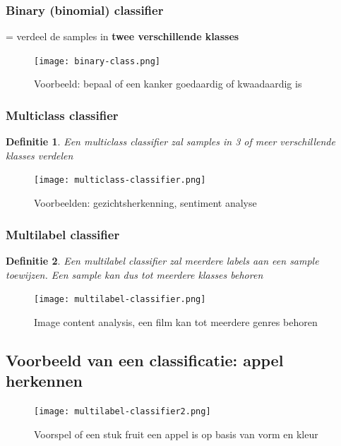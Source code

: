 \documentclass{article}
\newtheorem{theorem}{Definitie}[section]
\begin{document}
\subsubsection{Binary (binomial) classifier}

= verdeel de samples in \textbf{twee verschillende klasses}

\begin{figure}[H]
    \centering
    \texttt{[image: binary-class.png]}
    \caption{Voorbeeld: bepaal of een kanker goedaardig of kwaadaardig is}
\end{figure}

\subsubsection{Multiclass classifier}

\begin{theorem}
    Een multiclass classifier zal samples in 3 of meer verschillende klasses verdelen
\end{theorem}

\begin{figure}[H]
    \centering
    \texttt{[image: multiclass-classifier.png]}
    \caption{Voorbeelden: gezichtsherkenning, sentiment analyse}
\end{figure}

\subsubsection{Multilabel classifier}

\begin{theorem}
    Een multilabel classifier zal meerdere labels aan een sample toewijzen.
    Een sample kan dus tot meerdere klasses behoren
\end{theorem}

\begin{figure}[H]
    \centering
    \texttt{[image: multilabel-classifier.png]}
    \caption{Image content analysis, een film kan tot meerdere genres behoren}
\end{figure}

\subsection{Voorbeeld van een classificatie: appel herkennen}

\begin{figure}[H]
    \centering
    \texttt{[image: multilabel-classifier2.png]}
    \caption{Voorspel of een stuk fruit een appel is op basis van vorm en kleur}
\end{figure}
\end{document}
